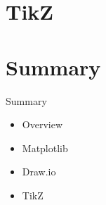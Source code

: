 \documentclass{../TexTemplate/myslide}
\begin{document}
\section{TikZ}
\begin{frame}
\sectionpage
\end{frame}

\section{Summary}
\begin{frame}
\sectionpage
\end{frame}

\begin{frame}{Summary}
\begin{itemize}
	\item Overview
	\item Matplotlib
	\item Draw.io
	\item TikZ
\end{itemize}
\end{frame}
\end{document}
